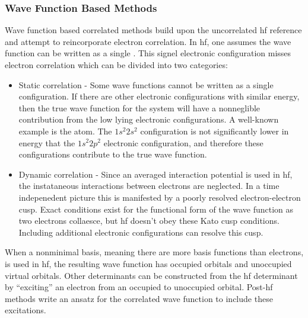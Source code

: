 \subsubsection{Wave Function Based Methods}
Wave function based correlated methods build upon  the uncorrelated \gls{hf} reference and attempt to reincorporate electron correlation.
In \gls{hf}, one assumes the wave function can be written as a single .
This signel electronic configuration misses electron correlation which can be divided into two categories:
\begin{itemize}
\item Static correlation - Some wave functions cannot be written as a single configuration. If there are other electronic configurations with similar energy, then the true wave function for the system will have a nonneglible contribution from the low lying electronic configurations. A well-known example is the  atom. The $1s^2 2s^2$ configuration is not significantly lower in energy that the $1s^2 2p^2$ electronic configuration, and therefore these configurations contribute to the true wave function.\cite{10.1063/1.1669638, 10.1103/PhysRevA.4.908, 10.1103/PhysRevA.14.1965, 10.1103/PhysRevA.65.042507, 10.1063/1.477970}

\item Dynamic correlation - Since an averaged interaction potential is used in \gls{hf}, the instataneous interactions between electrons are neglected. In a time indepenedent picture this is manifested by a poorly resolved electron-electron cusp. Exact conditions exist for the functional form of the wave function as two electrons collaesce, but \gls{hf} doesn't obey these Kato cusp conditions.\cite{10.1002/cpa.3160100201} Including additional electronic configurations can resolve this cusp.
\end{itemize}

When a nonminimal basis, meaning there are more basis functions than electrons, is used in \gls{hf}, the resulting wave function has occupied orbitals and unoccupied virtual orbitals.
Other determinants can be constructed from the \gls{hf} determinant by ``exciting'' an electron from an occupied to unoccupied orbital.
Post-\gls{hf} methods write an ansatz for the correlated wave function to include these excitations.

